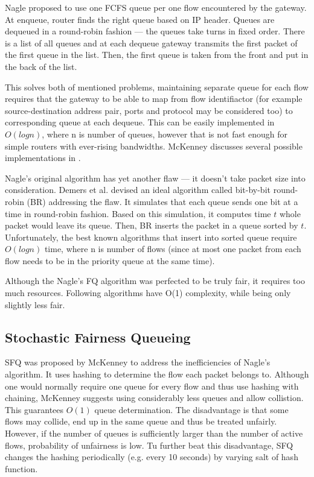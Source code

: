 Nagle \cite{Nagle:FQ} proposed to use one FCFS queue per one flow encountered by the gateway. At enqueue, router finds the right queue based on IP header. Queues are dequeued in a round-robin fashion --- the queues take turns in fixed order. There is a list of all queues and at each dequeue gateway transmits the first packet of the first queue in the list. Then, the first queue is taken from the front and put in the back of the list.


This solves both of mentioned problems, maintaining separate queue for each flow requires that the gateway to be able to map from flow identifiactor (for example source-destination address pair, ports and protocol may be considered too) to corresponding queue at each dequeue. This can be easily implemented in $O(log n)$, where n is number of queues, however that is not fast enough for simple routers with ever-rising bandwidths. McKenney discusses several possible implementations in \cite[Section 2]{SFQ}.

Nagle's original algorithm has yet another flaw --- it doesn't take packet size into consideration. Demers et al. devised an ideal algorithm called bit-by-bit round-robin (BR) \cite{demers1989analysis} addressing the flaw. It simulates that each queue sends one bit at a time in round-robin fashion. Based on this simulation, it computes time $t$ whole packet would leave its queue. Then, BR inserts the packet in a queue sorted by $t$. Unfortunately, the best known algorithms that insert into sorted queue require $O(log n)$ time, where n is number of flows (since at most one packet from each flow needs to be in the priority queue at the same time).

Although the Nagle's FQ algorithm was perfected to be truly fair, it requires too much resources. Following algorithms have O(1) complexity, while being only slightly less fair.


\subsection{Stochastic Fairness Queueing}

SFQ was proposed by McKenney \cite{SFQ} to address the inefficiencies of Nagle’s algorithm. It uses hashing to determine the flow each packet belongs to. Although one would normally require one queue for every flow and thus use hashing with chaining, McKenney suggests using considerably less queues and allow collistion. This guarantees $O(1)$ queue determination. The disadvantage is that some flows may collide, end up in the same queue and thus be treated unfairly. However, if the number of queues is sufficiently larger than the number of active flows, probability of unfairness is low.
Tu further beat this disadvantage, SFQ changes the hashing periodically (e.g. every 10 seconds) by varying salt of hash function.

